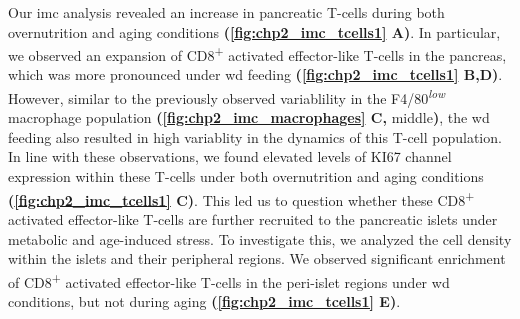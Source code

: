 \par Our \gls{imc} analysis revealed an increase in pancreatic T-cells during both overnutrition and aging conditions \textbf{(\autoref{fig:chp2_imc_tcells1} A)}. In particular, we observed an expansion of CD8\textsuperscript{+} activated effector-like T-cells in the pancreas, which was more pronounced under \gls{wd} feeding \textbf{(\autoref{fig:chp2_imc_tcells1} B,D)}. However, similar to the previously observed variablility in the F4/80\textsuperscript{\textit{low}} macrophage population \textbf{(\autoref{fig:chp2_imc_macrophages} C,} middle\textbf{)}, the \gls{wd} feeding also resulted in high variablity in the dynamics of this T-cell population. In line with these observations, we found elevated levels of KI67 channel expression within these T-cells under both overnutrition and aging conditions \textbf{(\autoref{fig:chp2_imc_tcells1} C)}. This led us to question whether these CD8\textsuperscript{+} activated effector-like T-cells are further recruited to the pancreatic islets under metabolic and age-induced stress. To investigate this, we analyzed the cell density within the islets and their peripheral regions. We observed significant enrichment of CD8\textsuperscript{+} activated effector-like T-cells in the peri-islet regions under \gls{wd} conditions, but not during aging \textbf{(\autoref{fig:chp2_imc_tcells1} E)}.\\


